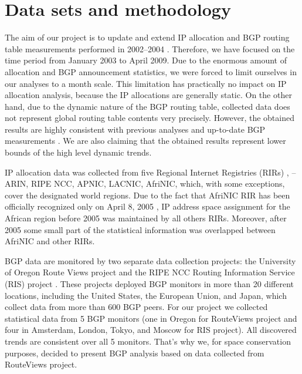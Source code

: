 \section{Data sets and methodology}
\label{sec:data sets}

The aim of our project is to update and extend IP allocation and BGP routing
table measurements performed in 2002--2004
\cite{Meng:2003:An-analysis-of-BGP-routing} \cite{Xu:2003:IPv4-Address}
\cite{Meng:2005:IPv4-address}. Therefore, we have focused on the time period
from January 2003 to April 2009. Due to the enormous amount of allocation and
BGP announcement statistics, we were forced to limit ourselves in our analyses
to a month scale. This limitation has practically no impact on IP allocation
analysis, because the IP allocations are generally static. On the other hand,
due to the dynamic nature of the BGP routing table, collected data does not
represent global routing table contents very precisely. However, the obtained
results are highly consistent with previous analyses
\cite{Meng:2005:IPv4-address} and up-to-date BGP measurements
\cite{::IPv4-Address-Report}. We are also claiming that the obtained results
represent lower bounds of the high level dynamic trends.


IP allocation data was collected from five Regional Internet Registries (RIRs)
\cite{::IANA----Number}, -- ARIN, RIPE NCC, APNIC, LACNIC, AfriNIC, which,
with some exceptions, cover the designated world regions. Due to the fact that
AfriNIC RIR has been officially recognized only on April 8, 2005
\cite{AKPLOGAN:2005:AfriNIC-now-officially}, IP address space assignment for
the African region before 2005 was maintained by all others RIRs. Moreover,
after 2005 some small part of the statistical information was overlapped
between AfriNIC and other RIRs.

BGP data are monitored by two separate data collection projects: the
University of Oregon Route Views project \cite{::Route-Views} and the RIPE NCC
Routing Information Service (RIS) project \cite{::RIS}. These projects
deployed BGP monitors in more than 20 different locations, including the
United States, the European Union, and Japan, which collect data from more
than 600 BGP peers. For our project we collected statistical data from 5
BGP monitors (one in Oregon for RouteViews project and four in Amsterdam,
London, Tokyo, and Moscow for RIS project). All discovered trends are
consistent over all 5 monitors. That's why we, for space conservation
purposes, decided to present BGP analysis based on data collected from
RouteViews project.


